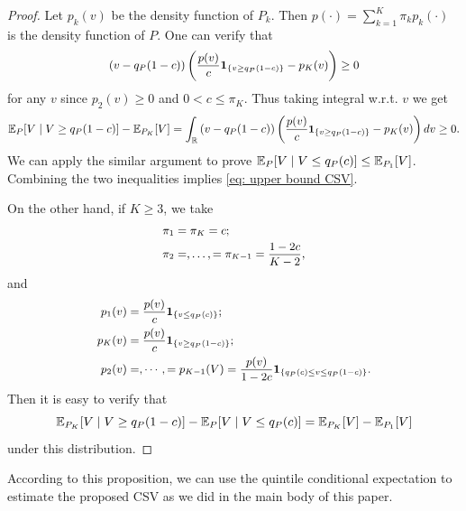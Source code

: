 \begin{proof}
	Let $p_{k}(v)$ be the density function of $P_{k}$. Then $p(\cdot) = \sum_{k=1}^{K}\pi_{k}p_{k}(\cdot)$ is the density function of $P$. One can verify that 
	\begin{equation}
		\small
		\begin{aligned}
			\left(v - q_{P}(1 - c)\right)\left(\frac{p(v)}{c}\textbf{1}_{\{v \geq q_{P}(1 - c)\}} - p_{K}(v)\right) \geq 0 
		\end{aligned}
	\end{equation}
	for any $v$ since $p_{2}(v) \geq 0$ and $0 < c \leq \pi_{K}$. Thus taking integral w.r.t. $v$ we get 
	\begin{equation}
		\small
		\mE_{P}[V\mid V\geq q_{P}(1 - c)] - \mE_{P_{K}}[V] = \int_{\bbR} \left(v - q_{P}(1 - c)\right)\left(\frac{p(v)}{c}\textbf{1}_{\{v \geq q_{P}(1 - c)\}} - p_{K}(v)\right)dv \geq 0. 
	\end{equation} 
	We can apply the similar argument to prove $\mathbb{E}_{P}[V\mid V\leq q_{P}(c)] \leq \mathbb{E}_{P_{1}}[V]$. Combining the two inequalities implies \eqref{eq: upper bound CSV}. 
	
	On the other hand, if $K \geq 3$, we take 
	\begin{equation}
		\small
		\begin{aligned}
			\pi_{1} & = \pi_{K} = c; \\
			\pi_{2} & =, \dots, = \pi_{K-1} = \frac{1 - 2c}{K-2},
		\end{aligned}
	\end{equation}
	and 
	\begin{equation}
		\small
		\begin{aligned}
			p_{1}(v) &= \frac{p(v)}{c}\textbf{1}_{\{v\leq q_{P}(c)\}}; \\
			p_{K}(v) &= \frac{p(v)}{c} \textbf{1}_{\{v\geq q_{P}(1-c)\}}; \\
			p_{2}(v) &= ,\cdots, = p_{K-1}(V) = \frac{p(v)}{1 - 2c}\textbf{1}_{\{q_{P}(c)\leq v \leq q_{P}(1-c)\}}.
		\end{aligned}
	\end{equation}
	Then it is easy to verify that
	\begin{equation}
		\small
		\mE_{P_{K}}[V\mid V\geq q_{P}(1 - c)] - \mE_{P}[V\mid V\leq q_{P}(c)] = \mE_{P_{K}}[V] - \mE_{P_{1}}[V]
	\end{equation}
	under this distribution.
\end{proof} 
According to this proposition, we can use the quintile conditional expectation to estimate the proposed CSV as we did in the main body of this paper. 
